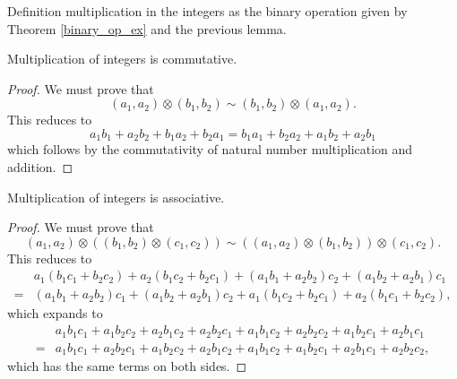 \documentclass[../../math.tex]{subfiles}
\begin{document}
\begin{instance}
    Definition multiplication in the integers as the binary operation given by
    Theorem \ref{binary_op_ex} and the previous lemma.
\end{instance}

\begin{instance}
    Multiplication of integers is commutative.
\end{instance}
\begin{proof}
    We must prove that
    \[
        (a_1, a_2) \otimes (b_1, b_2) \sim (b_1, b_2) \otimes (a_1, a_2).
    \]
    This reduces to
    \[
        a_1b_1 + a_2b_2 + b_1a_2 + b_2a_1 =
        b_1a_1 + b_2a_2 + a_1b_2 + a_2b_1
    \]
    which follows by the commutativity of natural number multiplication and
    addition.
\end{proof}

\begin{instance}
    Multiplication of integers is associative.
\end{instance}
\begin{proof}
    We must prove that
    \[
        (a_1, a_2) \otimes ((b_1, b_2) \otimes (c_1, c_2)) \sim
        ((a_1, a_2) \otimes (b_1, b_2)) \otimes (c_1, c_2).
    \]
    This reduces to
    \begin{align*}
        &{}a_1(b_1c_1 + b_2c_2) + a_2(b_1c_2 + b_2c_1) +
        (a_1b_1 + a_2b_2)c_2 + (a_1b_2 + a_2b_1)c_1 \\
        {}={}&
        (a_1b_1 + a_2b_2)c_1 + (a_1b_2 + a_2b_1)c_2 +
        a_1(b_1c_2 + b_2c_1) + a_2(b_1c_1 + b_2c_2),
    \end{align*}
    which expands to
    \begin{align*}
        &{}a_1b_1c_1 + a_1b_2c_2 + a_2b_1c_2 + a_2b_2c_1 +
        a_1b_1c_2 + a_2b_2c_2 + a_1b_2c_1 + a_2b_1c_1 \\
        {}={}&
        a_1b_1c_1 + a_2b_2c_1 + a_1b_2c_2 + a_2b_1c_2 +
        a_1b_1c_2 + a_1b_2c_1 + a_2b_1c_1 + a_2b_2c_2,
    \end{align*}
    which has the same terms on both sides.
\end{proof}
\end{document}
